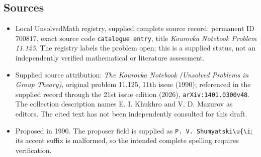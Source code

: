 \documentclass[11pt]{article}
\begin{document}
\subsection{Sources}
\begin{itemize}
\item Local UnsolvedMath registry, supplied complete source record: permanent ID \(700817\), exact source code \texttt{catalogue entry}, title \emph{Kourovka Notebook Problem 11.125}. The registry labels the problem open; this is a supplied status, not an independently verified mathematical or literature assessment.
\item Supplied source attribution: \emph{The Kourovka Notebook (Unsolved Problems in Group Theory)}, original problem 11.125, 11th issue (1990); referenced in the supplied record through the 21st issue edition (2026), \texttt{arXiv:1401.0300v48}. The collection description names E. I. Khukhro and V. D. Mazurov as editors. The cited text has not been independently consulted for this draft.
\item Proposed in 1990. The proposer field is supplied as \texttt{P. V. Shumyatski\textbackslash{}u\{\textbackslash{}i}; its accent suffix is malformed, so the intended complete spelling requires verification.
\end{itemize}
\end{document}
